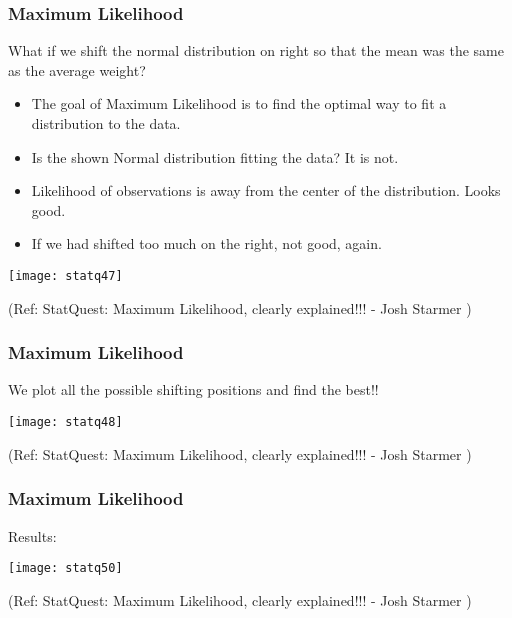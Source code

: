 \begin{frame}[fragile]\frametitle{Maximum Likelihood}
What if we shift the normal distribution on right so that the mean was the same as the average weight?

	\begin{itemize}
	\item The goal of Maximum Likelihood is to find the optimal way to fit a distribution to the data.
	\item Is the shown Normal distribution fitting the data? It is not.
	\item Likelihood of observations is away from the center of the distribution. Looks good.
	\item If we had shifted too much on the right, not good, again.
	\end{itemize}

      \begin{center}
      \texttt{[image: statq47]}
	  
	  	\end{center}

		\tiny{(Ref: StatQuest: Maximum Likelihood, clearly explained!!! - Josh Starmer )}

\end{frame}

\begin{frame}[fragile]\frametitle{Maximum Likelihood}
We plot all the possible shifting positions and find the best!!


      \begin{center}
      \texttt{[image: statq48]}
	  
	  	\end{center}

		\tiny{(Ref: StatQuest: Maximum Likelihood, clearly explained!!! - Josh Starmer )}

\end{frame}

\begin{frame}[fragile]\frametitle{Maximum Likelihood}
Results:

      \begin{center}
      \texttt{[image: statq50]}
	  
	  	\end{center}

		\tiny{(Ref: StatQuest: Maximum Likelihood, clearly explained!!! - Josh Starmer )}

\end{frame}
